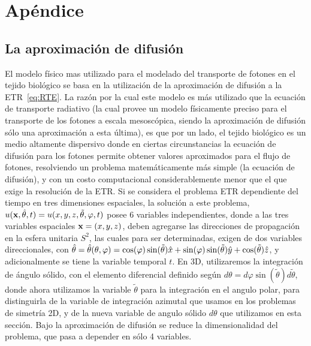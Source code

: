 \appendix
\chapter{Apéndice}%
\lhead{\thepage}
\vspace{0.01\textheight}
\section{La aproximación de difusión}
\label{ap:ecdiff}

El modelo físico mas utilizado para el modelado del transporte de fotones en el 
tejido biológico se basa en la utilización de la aproximación de 
difusión a la ETR~\eqref{eq:RTE}. La razón por la cual este modelo es más utilizado 
que la ecuación de transporte radiativo (la cual 
provee un modelo físicamente preciso para el transporte de los fotones a escala mesoscópica, 
siendo la aproximación de difusión sólo una aproximación a esta última), es que 
por un lado, el tejido biológico es un medio 
altamente dispersivo donde en ciertas circunstancias la ecuación de difusión para los fotones permite obtener valores aproximados para el flujo de fotones, resolviendo un problema matemáticamente 
más simple (la ecuación de difusión), y con un costo computacional 
considerablemente menor que el que exige la resolución de la ETR. 
Si se considera el problema ETR dependiente del tiempo 
en tres dimensiones espaciales, la solución a este problema, $u(\mathbf{x},\hat{\theta},t)=u(x,y,z,\tilde{\theta},\varphi,t)$  
posee 6 variables independientes, donde a las tres variables espaciales $\mathbf{x}=(x,y,z)$, 
deben agregarse las direcciones de propagación en la esfera unitaria $S^2$, las 
cuales para ser determinadas, exigen de dos variables direccionales, con $\hat{\theta}=\hat{\theta}(\theta,\varphi)=\cos(\varphi)\sin(\tilde{\theta})\hat x+\sin(\varphi)\sin(\tilde{\theta})\hat y+\cos(\tilde{\theta}) \hat z$, y adicionalmente se tiene la variable temporal $t$. En 3D, utilizaremos 
la integración de ángulo sólido, con el elemento diferencial definido según 
$d\theta= d\varphi \sin(\tilde{\theta}) d\tilde{\theta}$, 
donde ahora utilizamos la variable $\tilde{\theta}$ para la integración en el angulo polar, 
para distinguirla de la variable de integración azimutal que usamos en los problemas de simetría 2D, y de la nueva variable de angulo sólido $d\theta$ que utilizamos en esta sección. Bajo la aproximación 
de difusión se reduce la dimensionalidad del problema, que pasa a depender en sólo 4 variables. 
